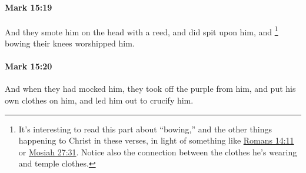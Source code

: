 		\paragraph{Mark 15:19} %
			\label{MARK-15-19}

			And they smote him on the head with a reed, and did spit upon him, and
				\footnote{%
					It's interesting to read this part about ``bowing,'' and the other things happening to Christ in these verses, in light of something like \hyperref[ROMANS-14-11]{Romans 14:11} or \hyperref[MOSIAH-27-31]{Mosiah 27:31}. Notice also the connection between the clothes he's wearing and temple clothes.
					}%
			bowing their knees worshipped him.

			\begin{framed}
			\scriptsize
				\begin{compactdesc}
					\item[SBLG] 
				\end{compactdesc}
			\end{framed}

		\paragraph{Mark 15:20} %
			\label{MARK-15-20}

			And when they had mocked him, they took off the purple from him, and put his own clothes on him, and led him out to crucify him.

